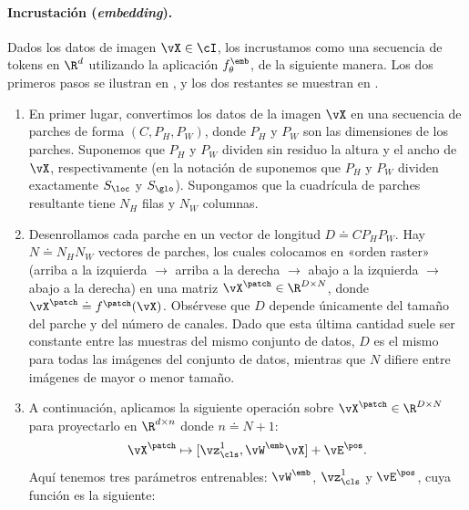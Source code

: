 \documentclass[../../book-main_es.tex]{subfiles}
\begin{document}
\paragraph{Incrustación (\textit{embedding}).} Dados los datos de imagen \(\vX \in \cI\), los incrustamos
como una secuencia de tokens en \(\R^{d}\) utilizando la aplicación
\(f_{\theta}^{\emb}\), de la siguiente manera. Los dos primeros pasos se ilustran
en , y los dos restantes se muestran en
.
\begin{enumerate}
    \item En primer lugar, convertimos los datos de la imagen \(\vX\) en una secuencia de
        parches de forma \((C, P_{H}, P_{W})\), donde \(P_{H}\) y
        \(P_{W}\) son las dimensiones de los parches. Suponemos que \(P_{H}\)
        y \(P_{W}\) dividen sin residuo la altura y el ancho de \(\vX\),
        respectivamente (en la notación de
             suponemos que
            \(P_{H}\) y \(P_{W}\) dividen exactamente \(S_{\loc}\) y
        \(S_{\glo}\)). Supongamos que la cuadrícula de parches resultante tiene
        \(N_{H}\) filas y \(N_{W}\) columnas.
    \item Desenrollamos cada parche en un vector de longitud \(D \doteq
        CP_{H}P_{W}\). Hay \(N \doteq N_{H}N_{W}\) vectores de parches,
        los cuales colocamos en «orden raster» (arriba a la izquierda \(\to\)
        arriba a la derecha \(\to\) abajo a la izquierda \(\to\) abajo a la derecha) en una
        matriz \(\vX^{\patch} \in \R^{D \times N}\), donde
        \(\vX^{\patch} \doteq f^{\patch}(\vX)\). Obsérvese que \(D\)
        depende únicamente del tamaño del parche y del número de canales. Dado que
        esta última cantidad suele ser constante entre las muestras del
        mismo conjunto de datos, \(D\) es el mismo para todas las imágenes del
        conjunto de datos, mientras que \(N\) difiere entre imágenes de mayor o menor tamaño.
    \item A continuación, aplicamos la siguiente operación sobre \(\vX^{\patch}
        \in \R^{D \times N}\) para proyectarlo en \(\R^{d \times n}\)
        donde \(n \doteq N + 1\):
        \begin{equation}
            \vX^{\patch} \mapsto [\vz_{\cls}^{1}, \vW^{\emb}\vX] + \vE^{\pos}.
        \end{equation}
        Aquí tenemos tres parámetros entrenables: \(\vW^{\emb}\),
        \(\vz_{\cls}^{1}\) y \(\vE^{\pos}\), cuya función es la siguiente:

\end{enumerate}
\end{document}
